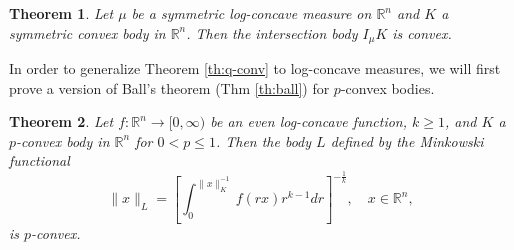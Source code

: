 \documentclass[12pt]{amsart} %
\newtheorem{theorem}{Theorem}
\renewcommand{\[}{\left[}
\renewcommand{\(}{\left(}
\renewcommand{\]}{\right]}
\renewcommand{\)}{\right)}
\renewcommand{\le}{\leqslant}
\renewcommand{\ge}{\geqslant}
\newcommand{\R}{\mathbb R}              %
\begin{document}
\begin{theorem}
Let $\mu$ be a symmetric  log-concave measure on $\R^n$ and $K$ a symmetric convex body in $\R^n$. Then the intersection body $I_\mu K$ is convex.
\end{theorem}


In order to generalize Theorem \ref{th:q-conv} to log-concave measures, we will first prove a version of Ball's theorem (Thm \ref{th:ball}) for $p$-convex bodies.




\begin{theorem}\label{th:log-concave}
Let $f:\R^n\rightarrow [0,\infty)$ be an even log-concave function, $k\ge 1$, and $K$ a $p$-convex body in $\R^n$ for $0<p\le 1$. Then the body $L$ defined by the Minkowski functional
$$
\|x\|_L = \left[\int_0^{\|x\|_K^{-1}} f(rx)r^{k-1}dr \right]^{-\frac 1k}, \quad x\in\R^n,
$$
is $p$-convex.
\end{theorem}
\end{document}
